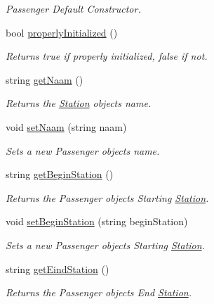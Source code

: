 \begin{DoxyCompactItemize}
\begin{DoxyCompactList}\small\item\em Passenger Default Constructor. \end{DoxyCompactList}\item 
bool \hyperlink{classPassagier_ae271ce7875b2a7d17704e204ce9d8568}{properly\+Initialized} ()
\begin{DoxyCompactList}\small\item\em Returns true if properly initialized, false if not. \end{DoxyCompactList}\item 
string \hyperlink{classPassagier_aa9a9b53d417979551b0cb30fb0fdd232}{get\+Naam} ()
\begin{DoxyCompactList}\small\item\em Returns the \hyperlink{classStation}{Station} object\textquotesingle{}s name. \end{DoxyCompactList}\item 
void \hyperlink{classPassagier_a8d7a04358b35de18f378d048610e9aff}{set\+Naam} (string naam)
\begin{DoxyCompactList}\small\item\em Sets a new Passenger object\textquotesingle{}s name. \end{DoxyCompactList}\item 
string \hyperlink{classPassagier_a41e0870bb942364181aa17e2c9c7ca6c}{get\+Begin\+Station} ()
\begin{DoxyCompactList}\small\item\em Returns the Passenger object\textquotesingle{}s Starting \hyperlink{classStation}{Station}. \end{DoxyCompactList}\item 
void \hyperlink{classPassagier_afc4826ff4dacbbe15f15f6e8ef338ff0}{set\+Begin\+Station} (string begin\+Station)
\begin{DoxyCompactList}\small\item\em Sets a new Passenger object\textquotesingle{}s Starting \hyperlink{classStation}{Station}. \end{DoxyCompactList}\item 
string \hyperlink{classPassagier_a721949463e02e122567c9967786a8a38}{get\+Eind\+Station} ()
\begin{DoxyCompactList}\small\item\em Returns the Passenger object\textquotesingle{}s End \hyperlink{classStation}{Station}. \end{DoxyCompactList}\item 

\end{DoxyCompactItemize}
